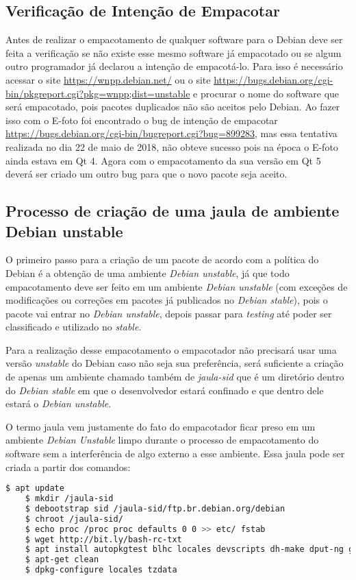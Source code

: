 \subsection{Verificação de Intenção de Empacotar}

Antes de realizar o empacotamento de qualquer software para o Debian deve ser feita a verificação se não existe esse mesmo software já empacotado ou se algum outro programador já declarou a intenção de empacotá-lo. Para isso é necessário acessar o site \url{https://wnpp.debian.net/} ou o site \url{https://bugs.debian.org/cgi-bin/pkgreport.cgi?pkg=wnpp;dist=unstable} e procurar o nome do software que será empacotado, pois pacotes duplicados não são aceitos pelo Debian. Ao fazer isso com o E-foto foi encontrado o bug de intenção de empacotar \url{https://bugs.debian.org/cgi-bin/bugreport.cgi?bug=899283}, mas essa tentativa realizada no dia 22 de maio de 2018, não obteve sucesso pois na época o E-foto ainda estava em Qt 4. Agora com o empacotamento da sua versão em Qt 5 deverá ser criado um outro bug para que o novo pacote seja aceito.

\subsection{Processo de criação de uma jaula de ambiente Debian unstable}

O primeiro passo para a criação de um pacote de acordo com a política do Debian é a obtenção de uma ambiente \textit{Debian unstable}, já que todo empacotamento deve ser feito em um ambiente \textit{Debian unstable} (com exceções de modificações ou correções em pacotes já publicados no \textit{Debian stable}), pois o pacote vai entrar no \textit{Debian unstable}, depois passar para \textit{testing} até poder ser classificado e utilizado no \textit{stable}.

Para a realização desse empacotamento o empacotador não precisará usar uma versão \textit{unstable} do Debian caso não seja sua preferência, será suficiente a criação de apenas um ambiente chamado também de \textit{jaula-sid} que é um diretório dentro do \textit{Debian stable} em que o desenvolvedor estará confinado e que dentro dele estará o \textit{Debian unstable}.

O termo jaula vem justamente do fato do empacotador ficar preso em um ambiente \textit{Debian Unstable} limpo durante o processo de empacotamento do software sem a interferência de algo externo a esse ambiente. Essa jaula pode ser criada a partir dos comandos: 
\begin{lstlisting}[language=bash]
	$ apt update
	$ mkdir /jaula-sid
	$ debootstrap sid /jaula-sid/ftp.br.debian.org/debian
	$ chroot /jaula-sid/
	$ echo proc /proc proc defaults 0 0 >> etc/ fstab
	$ wget http://bit.ly/bash-rc-txt
	$ apt install autopkgtest blhc locales devscripts dh-make dput-ng git-buildpackage mc quilt spell tardiff tree lintian
	$ apt-get clean
	$ dpkg-configure locales tzdata
\end{lstlisting}

